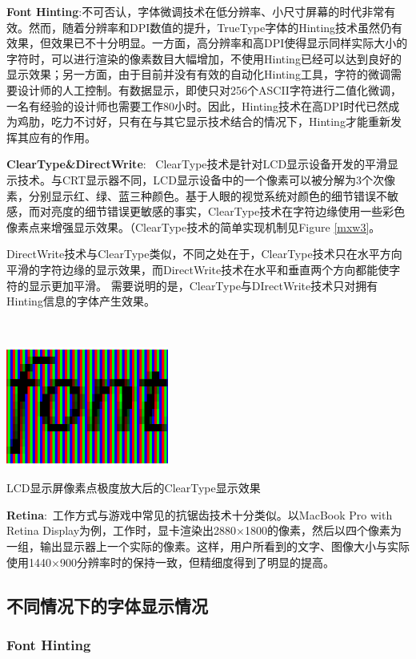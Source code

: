 \documentclass[a4paper]{article}
\begin{document}
\textbf{\large Font Hinting}:不可否认，字体微调技术在低分辨率、小尺寸屏幕的时代非常有效。然而，随着分辨率和DPI数值的提升，TrueType字体的Hinting技术虽然仍有效果，但效果已不十分明显。一方面，高分辨率和高DPI使得显示同样实际大小的字符时，可以进行渲染的像素数目大幅增加，不使用Hinting已经可以达到良好的显示效果；另一方面，由于目前并没有有效的自动化Hinting工具，字符的微调需要设计师的人工控制。有数据显示，即使只对256个ASCII字符进行二值化微调，一名有经验的设计师也需要工作80小时\cite{mxw3}。因此，Hinting技术在高DPI时代已然成为鸡肋，吃力不讨好，只有在与其它显示技术结合的情况下，Hinting才能重新发挥其应有的作用。

\textbf{\large ClearType\&DirectWrite}: ~ClearType技术是针对LCD显示设备开发的平滑显示技术。与CRT显示器不同，LCD显示设备中的一个像素可以被分解为3个次像素，分别显示红、绿、蓝三种颜色。基于人眼的视觉系统对颜色的细节错误不敏感，而对亮度的细节错误更敏感的事实，ClearType技术在字符边缘使用一些彩色像素点来增强显示效果\cite{mxw4}。（ClearType技术的简单实现机制见Figure \ref{mxw3}。

DirectWrite技术与ClearType类似，不同之处在于，ClearType技术只在水平方向平滑的字符边缘的显示效果，而DirectWrite技术在水平和垂直两个方向都能使字符的显示更加平滑。
需要说明的是，ClearType与DIrectWrite技术只对拥有Hinting信息的字体产生效果。

~~

\makeatletter
\def\@captype{figure}
\makeatother
\centerline{\includegraphics [width=0.4\textwidth]{mxw3.png} }
\caption{LCD显示屏像素点极度放大后的ClearType显示效果}
\label{mxw3}

\textbf{\large Retina}:~工作方式与游戏中常见的抗锯齿技术十分类似。以MacBook Pro with Retina Display为例，工作时，显卡渲染出2880×1800的像素，然后以四个像素为一组，输出显示器上一个实际的像素。这样，用户所看到的文字、图像大小与实际使用1440×900分辨率时的保持一致，但精细度得到了明显的提高。


\subsection{不同情况下的字体显示情况}

\subsubsection{Font Hinting}
\end{document}
